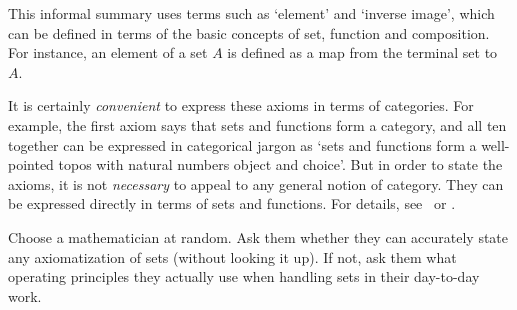 This informal summary uses terms such as `element' and `inverse image',
which can be defined in terms of the basic concepts of set, function and
composition.  For instance, an element of a set $A$ is defined as a map from
the terminal set to $A$.  

It is certainly \emph{convenient} to express these axioms in terms of
categories.  For example, the first axiom says that sets and functions form
a category, and all ten together can be expressed in categorical jargon as
`sets and functions form a well-pointed topos%
%
%
%
with natural numbers object and choice'.  But in order to state the axioms,
it is not \emph{necessary} to appeal to any general notion of category.
They can be expressed directly in terms of sets and functions.  For
details, see \citeLR\ or \citeRST.%
%
%
%
%
%


\exone


\begin{question}
Choose a mathematician at random.  Ask them whether they can accurately
state any axiomatization of sets (without looking it up).  If not, ask them
what operating principles they actually use when handling sets in their
day-to-day work. 
\end{question}
